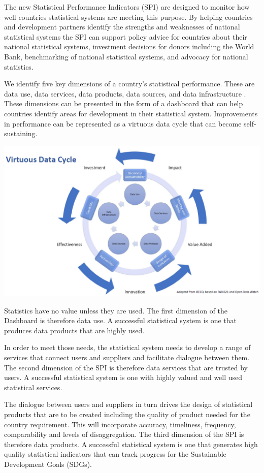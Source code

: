 \documentclass[
]{article}
\begin{document}
The new Statistical Performance Indicators (SPI) are designed to monitor how well countries statistical systems are meeting this purpose. By helping countries and development partners identify the strengths and weaknesses of national statistical systems the SPI can support policy advice for countries about their national statistical systems, investment decisions for donors including the World Bank, benchmarking of national statistical systems, and advocacy for national statistics.

We identify five key dimensions of a country's statistical performance. These are data use, data services, data products, data sources, and data infrastructure . These dimensions can be presented in the form of a dashboard that can help countries identify areas for development in their statistical system. Improvements in performance can be represented as a virtuous data cycle that can become self-sustaining.

\includegraphics{SPI_cycle.png}

Statistics have no value unless they are used. The first dimension of the Dashboard is therefore data use. A successful statistical system is one that produces data products that are highly used.

In order to meet those needs, the statistical system needs to develop a range of services that connect users and suppliers and facilitate dialogue between them. The second dimension of the SPI is therefore data services that are trusted by users. A successful statistical system is one with highly valued and well used statistical services.

The dialogue between users and suppliers in turn drives the design of statistical products that are to be created including the quality of product needed for the country requirement. This will incorporate accuracy, timeliness, frequency, comparability and levels of disaggregation. The third dimension of the SPI is therefore data products. A successful statistical system is one that generates high quality statistical indicators that can track progress for the Sustainable Development Goals (SDGs).
\end{document}
